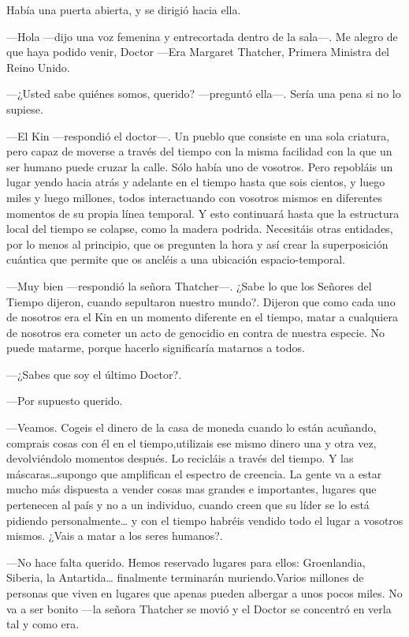 Había una puerta abierta, y se dirigió hacia ella.

---Hola ---dijo una voz femenina y entrecortada dentro de la sala---. Me alegro de que haya podido venir, Doctor ---Era Margaret Thatcher, Primera Ministra del Reino Unido.

---¿Usted sabe quiénes somos, querido? ---preguntó ella---. Sería una pena si no lo supiese.

---El Kin ---respondió el doctor---. Un pueblo que consiste en una sola criatura, pero capaz de moverse a través del tiempo con la misma facilidad con la que un ser humano puede cruzar la calle. Sólo había uno de vosotros. Pero repobláis un lugar yendo hacia atrás y adelante en el tiempo hasta que sois cientos, y luego miles y luego millones, todos interactuando con vosotros mismos en diferentes momentos de su propia línea temporal. Y esto continuará hasta que la estructura local del tiempo se colapse, como la madera podrida. Necesitáis otras entidades, por lo menos al principio, que os pregunten la hora y así crear la superposición cuántica que permite que os ancléis a una ubicación espacio-temporal.

---Muy bien ---respondió la señora Thatcher---. ¿Sabe lo que los Señores del Tiempo dijeron, cuando sepultaron nuestro mundo?. Dijeron que como cada uno de nosotros era el Kin en un momento diferente en el tiempo, matar a cualquiera de nosotros era cometer un acto de genocidio en contra de nuestra especie. No puede matarme, porque hacerlo significaría matarnos a todos.

---¿Sabes que soy el último Doctor?.

---Por supuesto querido.

---Veamos. Cogeis el dinero de la casa de moneda cuando lo están acuñando, comprais cosas con él en el tiempo,utilizais ese mismo dinero una y otra vez, devolviéndolo momentos después. Lo recicláis a través del tiempo. Y las máscaras\ldots{}supongo que amplifican el espectro de creencia. La gente va a estar mucho más dispuesta a vender cosas mas grandes e importantes, lugares que pertenecen al país y no a un individuo, cuando creen que su líder se lo está pidiendo personalmente\ldots{} y con el tiempo habréis vendido todo el lugar a vosotros mismos. ¿Vais a matar a los seres humanos?.

---No hace falta querido. Hemos reservado lugares para ellos: Groenlandia, Siberia, la Antartida\ldots{} finalmente terminarán muriendo.Varios millones de personas que viven en lugares que apenas pueden albergar a unos pocos miles. No va a ser bonito ---la señora Thatcher se movió y el Doctor se concentró en verla tal y como era.

